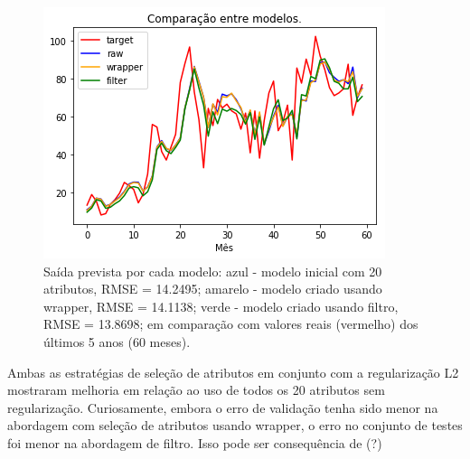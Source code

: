 \documentclass[a4paper, 12pt]{article}
\begin{document}
\begin{figure}[h!]
    \centering
  \includegraphics[width=10cm]{images/comparison.png}
    \caption{Saída prevista por cada modelo: azul - modelo inicial com 20 atributos, RMSE = 14.2495; amarelo - modelo criado usando wrapper, RMSE = 14.1138; verde - modelo criado usando filtro, RMSE = 13.8698;  em comparação com valores reais (vermelho) dos últimos 5 anos (60 meses).}
\end{figure}

Ambas as estratégias de seleção de atributos em conjunto com a regularização L2 mostraram melhoria em relação ao uso de todos os 20 atributos sem regularização. Curiosamente, embora o erro de validação tenha sido menor na abordagem com seleção de atributos usando wrapper, o erro no conjunto de testes foi menor na abordagem de filtro. Isso pode ser consequência de (?)
\end{document}

